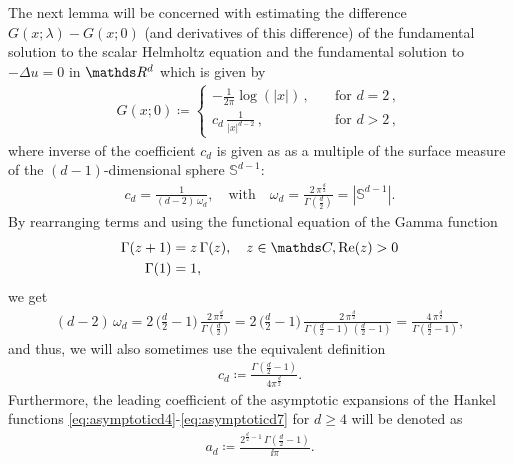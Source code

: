 The next lemma will be concerned with estimating the difference $G(x;\lambda) - G(x; 0)$ (and derivatives of this difference) of the fundamental solution to the scalar Helmholtz equation and the fundamental solution to $-\Delta u = 0$ in $\R^d$ which is given by
\begin{align}
  \label{eq:laplace}
  G(x;0) \coloneqq \begin{cases} -\frac{1}{2\pi} \log(|x|)\,, &\quad\text{for } d = 2\,, \\
                                 c_d \, \frac{1}{|x|^{d - 2}}\,, &\quad\text{for } d > 2\,,  \end{cases}
\end{align}
where inverse of the coefficient $c_d$ is given as as a multiple of the surface measure of the $(d-1)$-dimensional sphere $\mathbb{S}^{d - 1}$:
\begin{align}
  \label{eq:wd}
  c_d = \frac{1}{(d - 2) \, \omega_d}, \quad\text{with}\quad \omega_d = \frac{2\,\pi^{\frac{d}{2}}}{\Gamma(\frac{d}{2})} = |\mathbb{S}^{d - 1}|.
\end{align}
By rearranging terms and using the functional equation of the Gamma function 
\begin{align}
  \label{eq:functionalGamma}
  \begin{alignedat}{1}
    \Gamma(z + 1) &= z\, \Gamma(z), \quad z \in \C, \Re(z) > 0 \\
    \Gamma(1) &= 1,
  \end{alignedat}
\end{align}
we get
\begin{align*}
  (d - 2)\, \omega_d 
  = 2  \, \bigg( \frac{d}{2} - 1\bigg)\, \frac{2\, \pi^{\frac{d}{2}}}{\Gamma(\frac{d}{2})}
  =  2 \, \bigg( \frac{d}{2} - 1\bigg)\, \frac{2\, \pi^{\frac{d}{2}}}{\Gamma(\frac{d}{2} - 1)\,(\frac{d}{2} - 1)}
  = \frac{4\, \pi^{\frac{d}{2}}}{\Gamma(\frac{d}{2} - 1)},
\end{align*}
and thus, we will also sometimes use the equivalent definition
\begin{align}
  \label{eq:defncd}
  c_d \coloneqq \frac{\Gamma(\frac{d}{2} - 1)}{4 \pi^{\frac{d}{2}}}.
\end{align}
Furthermore, the leading coefficient of the asymptotic expansions of the Hankel functions \eqref{eq:asymptoticd4}-\eqref{eq:asymptoticd7} for $d \geq 4$ will be denoted as
\begin{align}
  \label{eq:Defnad}
  a_d \coloneqq \frac{2^{\frac{d}{2} - 1}\, \Gamma(\frac{d}{2} - 1)}{\ii \pi}.
\end{align}
